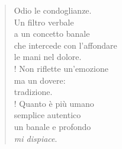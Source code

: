 
\begin{verse}
    Odio le condoglianze.\\
    Un filtro verbale\\
    a un concetto banale\\
    che intercede con l'affondare\\
    le mani nel dolore.\\!
    Non riflette un'emozione\\
    ma un dovere:\\
    tradizione.\\!
    Quanto è più umano\\
    semplice autentico\\
    un banale e profondo\\
    \textit{mi dispiace}.
\end{verse}